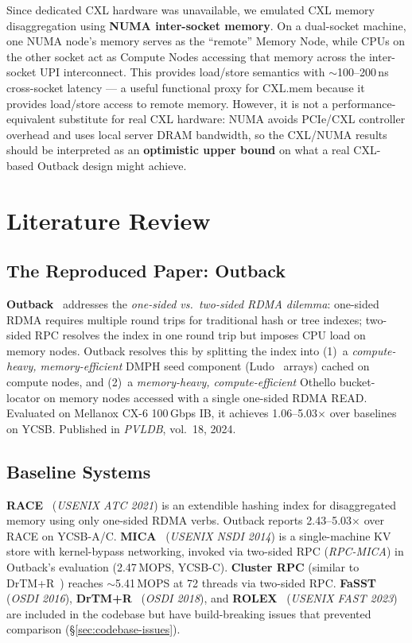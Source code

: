 \documentclass[conference]{IEEEtran}
\begin{document}
Since dedicated CXL hardware was unavailable, we emulated CXL memory disaggregation using \textbf{NUMA inter-socket memory}. On a dual-socket machine, one NUMA node's memory serves as the ``remote'' Memory Node, while CPUs on the other socket act as Compute Nodes accessing that memory across the inter-socket UPI interconnect. This provides load/store semantics with $\sim$100--200\,ns cross-socket latency --- a useful functional proxy for CXL.mem because it provides load/store access to remote memory. However, it is not a performance-equivalent substitute for real CXL hardware: NUMA avoids PCIe/CXL controller overhead and uses local server DRAM bandwidth, so the CXL/NUMA results should be interpreted as an \textbf{optimistic upper bound} on what a real CXL-based Outback design might achieve.

\section{Literature Review}\label{sec:litreview}

\subsection*{The Reproduced Paper: Outback}

\textbf{Outback}~\cite{outback} addresses the \emph{one-sided vs.\ two-sided RDMA dilemma}: one-sided RDMA requires multiple round trips for traditional hash or tree indexes; two-sided RPC resolves the index in one round trip but imposes CPU load on memory nodes. Outback resolves this by splitting the index into (1)~a \emph{compute-heavy, memory-efficient} DMPH seed component (Ludo~\cite{ludo} arrays) cached on compute nodes, and (2)~a \emph{memory-heavy, compute-efficient} Othello bucket-locator on memory nodes accessed with a single one-sided RDMA READ. Evaluated on Mellanox CX-6 100\,Gbps IB, it achieves 1.06--5.03$\times$ over baselines on YCSB. Published in \emph{PVLDB}, vol.\ 18, 2024.

\subsection*{Baseline Systems}

\textbf{RACE}~\cite{race} (\emph{USENIX ATC 2021}) is an extendible hashing index for disaggregated memory using only one-sided RDMA verbs. Outback reports 2.43--5.03$\times$ over RACE on YCSB-A/C. \textbf{MICA}~\cite{mica} (\emph{USENIX NSDI 2014}) is a single-machine KV store with kernel-bypass networking, invoked via two-sided RPC (\textit{RPC-MICA}) in Outback's evaluation (2.47\,MOPS, YCSB-C). \textbf{Cluster RPC} (similar to DrTM+R~\cite{drtmr}) reaches $\sim$5.41\,MOPS at 72 threads via two-sided RPC. \textbf{FaSST}~\cite{fasst} (\emph{OSDI 2016}), \textbf{DrTM+R}~\cite{drtmr} (\emph{OSDI 2018}), and \textbf{ROLEX}~\cite{rolex} (\emph{USENIX FAST 2023}) are included in the codebase but have build-breaking issues that prevented comparison (\S\ref{sec:codebase-issues}).
\end{document}
